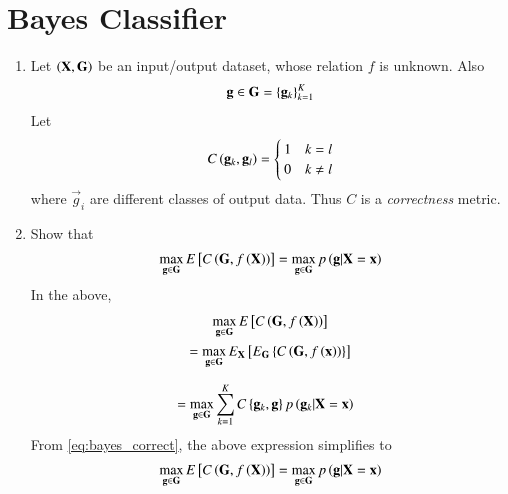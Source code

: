 \documentclass[journal,12pt,twocolumn]{IEEEtran}
\renewcommand\thesection{\arabic{section}}
\begin{document}
%

\section{Bayes Classifier}
\begin{enumerate}[label=\thesection.\arabic*
,ref=\thesection.\theenumi]
\item Let $\left(\mathbf{X},\mathbf{G}\right)$ be an input/output dataset, whose relation $f$ is unknown. Also
\begin{align}
\mathbf{g}\in\mathbf{G} = \left\{\mathbf{g}_k\right\}_{k=1}^{K}
\end{align}
Let 
\begin{align}
\label{eq:bayes_correct}
C\left(\mathbf{g}_k,\mathbf{g}_l\right) =
\begin{cases}
1 & k= l
\\
0 & k\ne l
\end{cases}
\end{align}
%
where $\vec{g}_i$ are different classes of output data. Thus $C$ is a {\em correctness} metric.
\item Show that 
\begin{align}
\max_{\mathbf{g}\in\mathbf{G}}E{}\left[C\left(\mathbf{G},f\left(\mathbf{X}\right)\right)\right] 
= \max_{\mathbf{g}\in\mathbf{G}}p\left(\mathbf{g}|\mathbf{X}=\mathbf{x}\right) 
\end{align}
\solution In the above, 
\begin{multline}
\max_{\mathbf{g}\in\mathbf{G}}E{}\left[C\left(\mathbf{G},f\left(\mathbf{X}\right)\right)\right] 
\\
= \max_{\mathbf{g}\in\mathbf{G}}E_\mathbf{X}{}\left[E_{\mathbf{G}}\left\{C\left(\mathbf{G},f\left(\mathbf{x}\right)\right)\right\}\right] 
\end{multline}

\begin{align}
&=\max_{\mathbf{g}\in\mathbf{G}}\sum_{k=1}^{K}C\left\{\mathbf{g}_k,\mathbf{g}\right\}p\left(\mathbf{g}_k|\mathbf{X}=\mathbf{x}\right) 
\end{align}
From \eqref{eq:bayes_correct}, the above expression simplifies to
\begin{align}
\max_{\mathbf{g}\in\mathbf{G}}E{}\left[C\left(\mathbf{G},f\left(\mathbf{X}\right)\right)\right] =\max_{\mathbf{g}\in\mathbf{G}}p\left(\mathbf{g}|\mathbf{X}=\mathbf{x}\right) 
\end{align}

\end{enumerate}
\end{document}
